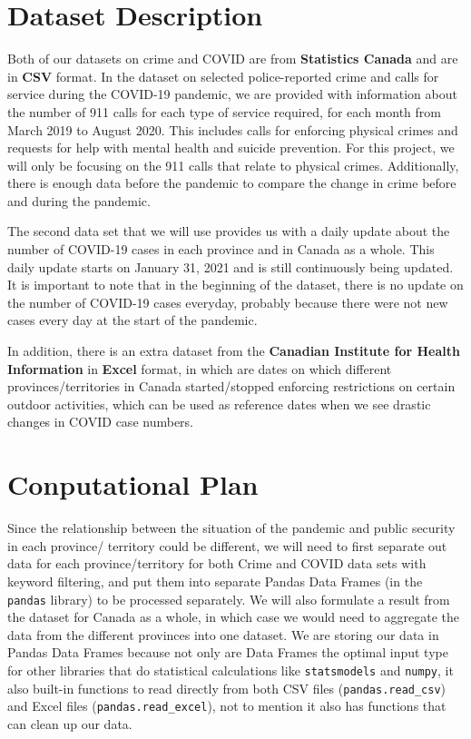 \documentclass[fontsize=11pt]{article}
\begin{document}
\section{Dataset Description}
Both of our datasets on crime and COVID are from \textbf{Statistics Canada} and are in \textbf{CSV} format. In the dataset on selected police-reported crime and calls for service during the COVID-19 pandemic\cite{crime}, we are provided with information about the number of 911 calls for each type of service required, for each month from March 2019 to August 2020. This includes calls for enforcing physical crimes and requests for help with mental health and suicide prevention. For this project, we will only be focusing on the 911 calls that relate to physical crimes. Additionally, there is enough data before the pandemic to compare the change in crime before and during the pandemic.

The second data set\cite{covid} that we will use provides us with a daily update about the number of COVID-19 cases in each province and in Canada as a whole. This daily update starts on January 31, 2021 and is still continuously being updated. It is important to note that in the beginning of the dataset, there is no update on the number of COVID-19 cases everyday, probably because there were not new cases every day at the start of the pandemic.

In addition, there is an extra dataset from the \textbf{Canadian Institute for Health Information} in \textbf{Excel} format\cite{intervention}, in which are dates on which different provinces/territories in Canada started/stopped enforcing restrictions on certain outdoor activities, which can be used as reference dates when we see drastic changes in COVID case numbers.
\section{Conputational Plan}
Since the relationship between the situation of the pandemic and public security in each province/ territory could be different, we will need to first separate out data for each province/territory for both Crime and COVID data sets with keyword filtering, and put them into separate Pandas Data Frames (in the \verb+pandas+ library) to be processed separately. We will also formulate a result from the dataset for Canada as a whole, in which case we would need to aggregate the data from the different provinces into one dataset. We are storing our data in Pandas Data Frames because not only are Data Frames the optimal input type for other libraries that do statistical calculations like \verb+statsmodels+ and \verb+numpy+, it also built-in functions to read directly from both CSV files (\verb+pandas.read_csv+) and Excel files (\verb+pandas.read_excel+), not to mention it also has functions that can clean up our data.
\end{document}
